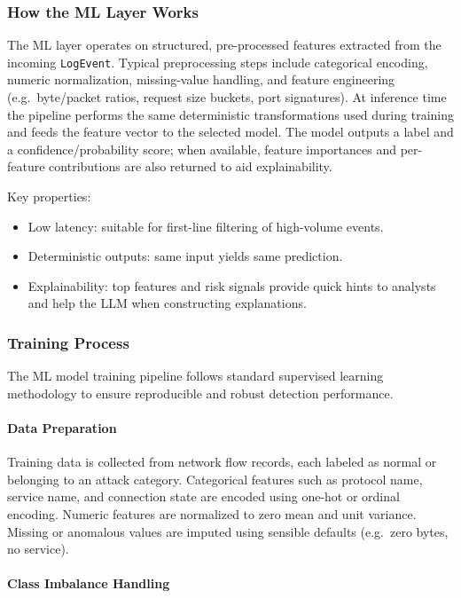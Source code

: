 \documentclass[12pt,a4paper]{report}
\begin{document}
\subsubsection{How the ML Layer Works}

The ML layer operates on structured, pre-processed features extracted from
the incoming \texttt{LogEvent}. Typical preprocessing steps include
categorical encoding, numeric normalization, missing-value handling, and
feature engineering (e.g.\ byte/packet ratios, request size buckets, port
signatures). At inference time the pipeline performs the same deterministic
transformations used during training and feeds the feature vector to the
selected model. The model outputs a label and a confidence/probability score;
when available, feature importances and per-feature contributions are also
returned to aid explainability.

Key properties:
\begin{itemize}[leftmargin=1.5em]
  \item Low latency: suitable for first-line filtering of high-volume events.
  \item Deterministic outputs: same input yields same prediction.
  \item Explainability: top features and risk signals provide quick hints to
    analysts and help the LLM when constructing explanations.
\end{itemize}

\subsubsection{Training Process}

The ML model training pipeline follows standard supervised learning methodology
to ensure reproducible and robust detection performance.

\paragraph{Data Preparation}

Training data is collected from network flow records, each labeled as normal or
belonging to an attack category. Categorical features such as protocol name,
service name, and connection state are encoded using one-hot or ordinal
encoding. Numeric features are normalized to zero mean and unit variance.
Missing or anomalous values are imputed using sensible defaults (e.g.\ zero
bytes, no service).

\paragraph{Class Imbalance Handling}
\end{document}
